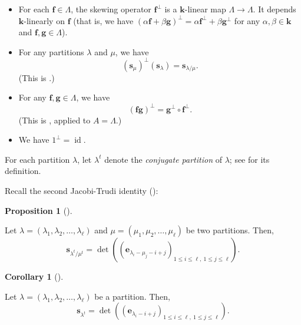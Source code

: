 \documentclass[numbers=enddot,12pt,final,onecolumn,notitlepage]{scrartcl}%
\theoremstyle{definition}
\newtheorem{prop}[theo]{Proposition}
\newenvironment{proposition}[1][]
{\begin{prop}[#1]\begin{leftbar}}
{\end{leftbar}\end{prop}}
\newtheorem{coro}[theo]{Corollary}
\newenvironment{corollary}[1][]
{\begin{coro}[#1]\begin{leftbar}}
{\end{leftbar}\end{coro}}
\begin{document}
\begin{itemize}
\item For each $\mathbf{f}\in\Lambda$, the skewing operator $\mathbf{f}%
^{\perp}$ is a $\mathbf{k}$-linear map $\Lambda\rightarrow\Lambda$. It depends
$\mathbf{k}$-linearly on $\mathbf{f}$ (that is, we have $\left(
\alpha\mathbf{f}+\beta\mathbf{g}\right)  ^{\perp}=\alpha\mathbf{f}^{\perp
}+\beta\mathbf{g}^{\perp}$ for any $\alpha,\beta\in\mathbf{k}$ and
$\mathbf{f},\mathbf{g}\in\Lambda$).

\item For any partitions $\lambda$ and $\mu$, we have
\begin{equation}
\left(  \mathbf{s}_{\mu}\right)  ^{\perp}\left(  \mathbf{s}_{\lambda}\right)
=\mathbf{s}_{\lambda/\mu}. \label{eq.skewing.ss}%
\end{equation}
(This is \cite[(2.8.2)]{GriRei18}.)

\item For any $\mathbf{f},\mathbf{g}\in\Lambda$, we have
\begin{equation}
\left(  \mathbf{fg}\right)  ^{\perp}=\mathbf{g}^{\perp}\circ\mathbf{f}^{\perp
}. \label{eq.skewing.fg}%
\end{equation}
(This is \cite[Proposition 2.8.2(ii)]{GriRei18}, applied to $A=\Lambda$.)

\item We have $1^{\perp}=\operatorname*{id}$.
\end{itemize}

For each partition $\lambda$, let $\lambda^{t}$ denote the \textit{conjugate
partition} of $\lambda$; see \cite[Definition 2.2.8]{GriRei18} for its definition.

Recall the second Jacobi-Trudi identity (\cite[(2.4.17)]{GriRei18}):

\begin{proposition}
\label{prop.jt.e}Let $\lambda=\left(  \lambda_{1},\lambda_{2},\ldots
,\lambda_{\ell}\right)  $ and $\mu=\left(  \mu_{1},\mu_{2},\ldots,\mu_{\ell
}\right)  $ be two partitions. Then,%
\[
\mathbf{s}_{\lambda^{t}/\mu^{t}}=\det\left(  \left(  \mathbf{e}_{\lambda
_{i}-\mu_{j}-i+j}\right)  _{1\leq i\leq\ell,\ 1\leq j\leq\ell}\right)  .
\]

\end{proposition}

\begin{corollary}
\label{cor.jt.el}Let $\lambda=\left(  \lambda_{1},\lambda_{2},\ldots
,\lambda_{\ell}\right)  $ be a partition. Then,%
\[
\mathbf{s}_{\lambda^{t}}=\det\left(  \left(  \mathbf{e}_{\lambda_{i}%
-i+j}\right)  _{1\leq i\leq\ell,\ 1\leq j\leq\ell}\right)  .
\]

\end{corollary}
\end{document}
